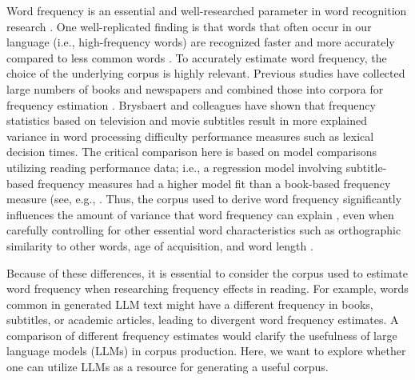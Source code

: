 \documentclass[jou, a4paper]{apa7}
\begin{document}
Word frequency is an essential and well-researched parameter in word recognition research \citep{brysbaert_impact_2016, brysbaert_word_2018, gregorova_access_2023}. One well-replicated finding is that words that often occur in our language (i.e., high-frequency words) are recognized faster and more accurately compared to less common words \citep[i.e., low-frequency words; ][]{adelman_contextual_2006, baayen_demythologizing_2010, brysbaert_impact_2016, gregorova_access_2023, hallin_effects_2018, lieven_input_2010, mcdonald_rethinking_2001, stokes_neighborhood_2010}. To accurately estimate word frequency, the choice of the underlying corpus is highly relevant. Previous studies have collected large numbers of books and newspapers and combined those into corpora for frequency estimation \citep[e.g.,][]{baayen_celex_1993, heister_dlexdb_2011}. Brysbaert and colleagues \citep{brysbaert_word_2011, brysbaert_word_2018} have shown that frequency statistics based on television and movie subtitles result in more explained variance in word processing difficulty performance measures such as lexical decision times. The critical comparison here is based on model comparisons utilizing reading performance data; i.e., a regression model involving subtitle-based frequency measures had a higher model fit than a book-based frequency measure (see, e.g., \citep{brysbaert_word_2011}. Thus, the corpus used to derive word frequency significantly influences the amount of variance that word frequency can explain  \citep{ferrand_french_2010, keuleers_subtlex-nl_2010, van_heuven_subtlex-uk_2014}, even when carefully controlling for other essential word characteristics such as orthographic similarity to other words, age of acquisition, and word length \citep{graf_faktorenanalyse_2005}. 

Because of these differences, it is essential to consider the corpus used to estimate word frequency when researching frequency effects in reading. For example, words common in generated LLM text might have a different frequency in books, subtitles, or academic articles, leading to divergent word frequency estimates. A comparison of different frequency estimates would clarify the usefulness of large language models (LLMs) in corpus production. Here, we want to explore whether one can utilize LLMs as a resource for generating a useful corpus. 
\end{document}
